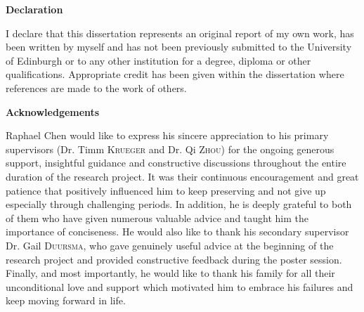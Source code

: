 \leavevmode%
\begin{center}
    \Large\bfseries\sffamily Declaration 
\end{center}

\noindent I declare that this dissertation represents an original report of my own work, has been written by myself and has not been previously submitted to the University of Edinburgh or to any other institution for a degree, diploma or other qualifications. Appropriate credit has been given within the dissertation where references are made to the work of others.

\vspace{20pt}

\begin{center}
    \Large\bfseries\sffamily Acknowledgements
\end{center}    

\noindent Raphael Chen would like to express his sincere appreciation to his primary supervisors (Dr. Timm \textsc{Krueger} and Dr. Qi \textsc{Zhou}) for the ongoing generous support, insightful guidance and constructive discussions throughout the entire duration of the research project. It was their continuous encouragement and great patience that positively influenced him to keep preserving and not give up especially through challenging periods. In addition, he is deeply grateful to both of them who have given numerous valuable advice and taught him the importance of conciseness. He would also like to thank his secondary supervisor Dr. Gail \textsc{Duursma}, who gave genuinely useful advice at the beginning of the research project and provided constructive feedback during the poster session. Finally, and most importantly, he would like to thank his family for all their unconditional love and support which motivated him to embrace his failures and keep moving forward in life.  